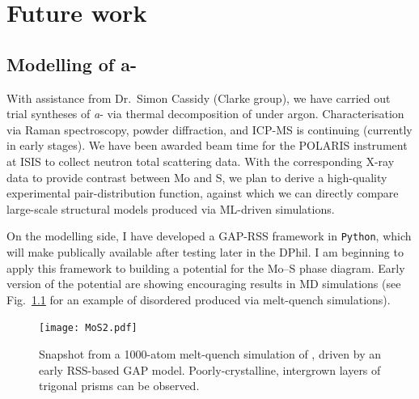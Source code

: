 \documentclass[12pt,a4paper,twoside,nobind]{ociamthesis}
\begin{document}


%
%
\chapter{Future work}


\section{Modelling of a-}

With assistance from Dr.\ Simon Cassidy (Clarke group), we have carried out trial syntheses of \textit{a}- via thermal decomposition of  under argon. 
Characterisation via Raman spectroscopy, powder diffraction, and ICP-MS
is continuing (currently in early stages). 
We have been awarded beam time for the POLARIS instrument at ISIS to collect neutron total scattering data. 
With the corresponding X-ray data to provide contrast between Mo and S, we plan to derive
a high-quality experimental pair-distribution function, against which we can directly compare large-scale structural models produced via ML-driven simulations.


On the modelling side, I have developed a GAP-RSS framework in \texttt{Python}, which will make publically available after testing later in the DPhil. I am beginning to apply this framework to building a potential for the Mo--S phase diagram.
Early version of the potential are showing encouraging results in MD simulations (see Fig.\ \ref{fig:MoS2} for an example of disordered  produced via melt-quench simulations). 

\begin{figure}[ht]
  \centering
  \texttt{[image: MoS2.pdf]}
  \caption{
    Snapshot from a 1000-atom melt-quench simulation of , driven by an early RSS-based GAP model. Poorly-crystalline, intergrown layers of \ce{[MoS6]} trigonal prisms can be observed.
    }
  \label{fig:MoS2}
\end{figure}
\end{document}
